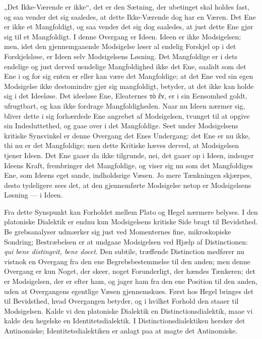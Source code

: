 \documentclass[12pt]{book}
\newcommand{\opage}[1]{\marginnote{\footnotesize\textit{[#1]}}}
\begin{document}
„Det Ikke-Værende er ikke“, det er den Sætning, der ubetinget skal holdes fast, og saa vender det
sig saaledes, at dette Ikke-Værende dog har en Væren. Det Ene er ikke et Mangfoldigt, og saa
vender det sig dog saaledes, at just dette Ene gjør sig til et Mangfoldigt. I denne Overgang er
Ideen. Ideen er ikke Modsigelsen; men, idet den gjennemgaaende Modsigelse løser al endelig
Forskjel op i det Forskjelsløse, er Ideen selv Modsigelsens Løsning. Det Mangfoldige er i dets
endelige og just derved uendelige Mangfoldighed ikke det Ene, saalidt som det Ene i og for sig
enten er eller kan være det Mangfoldige; at det Ene ved sin egen Modsigelse ikke destomindre gjør
sig mangfoldigt, betyder, at det ikke kan holde sig i det Ideeløse. Det ideeløse Ene, Eleaternes
τὸ ἕν, er i sin Eensomhed goldt, ufrugtbart, og kan ikke fordrage Mangfoldigheden. Naar nu Ideen
nærmer sig, bliver dette i sig forhærdede Ene angrebet af Modsigelsen, tvunget til at opgive sin
Indesluttethed, og gaae over i det Mangfoldige. Seet under Modsigelsens kritiske Synsvinkel er
denne Overgang det Enes Undergang: det Ene er nu ikke, thi nu er det Mangfoldige; men dette
Kritiske hæves derved, at Modsigelsen tjener Ideen. Det Ene gaaer da ikke tilgrunde, nei, det
gaaer op i Ideen, indsuger Ideens Kraft, frembringer det Mangfoldige, og viser sig nu som det
Mangfoldiges Ene, som Ideens eget sande, indholdsrige Væsen. Jo mere Tænkningen skjærpes, desto
tydeligere sees det, at den gjennemførte Modsigelse netop er Modsigelsens Løsning — i Ideen.

Fra dette Synspunkt kan Forholdet mellem Plato og Hegel nærmere belyses. I den platoniske
Dialektik er endnu kun Modsigelsens kritiske Side bragt til Bevidsthed. Be%
\opage{151}grebsanalyser udmærker sig just ved Momenternes fine, mikroskopiske Sondring; Bestræbelsen er at
undgaae Modsigelsen ved Hjælp af Distinctionen: \textit{qui bene distingvit, bene docet}. Den
subtile, træffende Distinction medfører nu vistnok en Overgang fra den ene Begrebsbestemmelse til
den anden; men denne Overgang er kun Noget, der skeer, noget Forunderligt, der hændes Tænkeren;
det er Modsigelsen, der er efter ham, og jager ham fra den ene Position til den anden, uden at
Overgangens egentlige Væsen gjennemskues. Først hos Hegel bringes det til Bevidsthed, hvad
Overgangen betyder, og i hvilket Forhold den staaer til Modsigelsen. Kalde vi den platoniske
Dialektik en Distinctionsdialektik, maae vi kalde den hegelske en Identitetsdialektik. I
Distinctionsdialektiken hersker det Antinomiske; Identitetsdialektiken er anlagt paa at magte det
Antinomiske.
\end{document}

